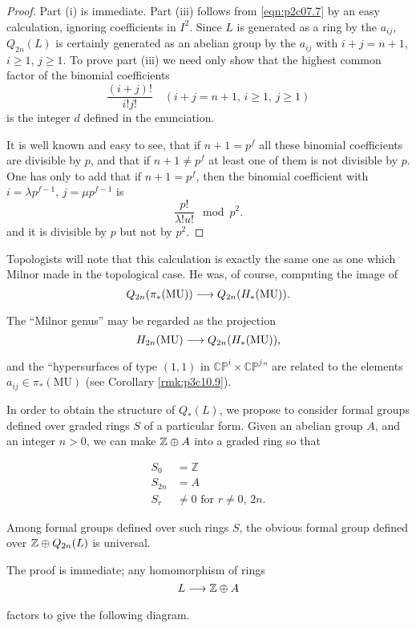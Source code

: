 \documentclass[../main]{subfiles}
\begin{document}
\begin{proof}
Part (i) is immediate. Part (iii) follows from \eqref{eqn:p2c07.7} by an easy calculation, ignoring coefficients in $I^2$. Since $L$ is generated as a ring by the $a_{ij}$, $Q_{2n}(L)$ is certainly generated as an abelian group by the $a_{ij}$ with $i + j = n + 1$, $i \ge 1$, $j \ge 1$. To prove part (iii) we need only show that the highest common factor of the binomial coefficients \[\frac {(i+j)!} {i! j!} \quad (i + j = n + 1, \, i \ge 1, \, j \ge 1)\] is the integer $d$ defined in the enunciation.

It is well known and easy to see, that if $n + 1 = p^f$ all these binomial coefficients are divisible by $p$, and that if $n + 1 \ne p^f$ at least one of them is not divisible by $p$. One has only to add that if $n + 1 = p^f$, then the binomial coefficient with $i = \lambda p^{f - 1}$, $j = \mu p^{f - 1}$ is \[\frac {p!} {\lambda! u!} \mod p^2.\] and it is divisible by $p$ but not by $p^2$. 
\end{proof}

Topologists will note that this calculation is exactly the same one as one which Milnor made in the topological case. He was, of course, computing the image of \[Q_{2n}(\pi_\ast(\mathrm{MU})) \lar{} Q_{2n}(H_\ast(\mathrm{MU})).\] The ``Milnor genus'' may be regarded as the projection \[H_{2n}(\mathrm{MU}) \lar{} Q_{2n}(H_\ast(\mathrm{MU})),\] and the ``hypersurfaces of type $(1,1)$ in $\mathbb {CP}^i \times \mathbb {CP}^j$'' are related to the elements $a_{ij} \in \pi_\ast(\mathrm{MU})$ (see Corollary \ref{rmk:p3c10.9}). 

In order to obtain the structure of $Q_\ast(L)$, we propose to consider formal groups defined over graded rings $S$ of a particular form. Given an abelian group $A$, and an integer $n > 0$, we can make $\mathbb{Z} \oplus A$ into a graded ring so that 

\begin{align*}
S_0 & = \mathbb Z \\ S_{2n} & = A \\ S_r & \ne 0 \text { for } r \ne 0, \, 2n.
\end{align*}

\begin{customlemma}{7.10}
\label{lem:p2c07.10}
Among formal groups defined over such rings $S$, the obvious formal group defined over $\mathbb{Z} \oplus Q_{2n}(L)$ is universal.
\end{customlemma}

The proof is immediate; any homomorphism of rings \[L \lar{} \bZ \oplus A\] factors to give the following diagram.
\end{document}
